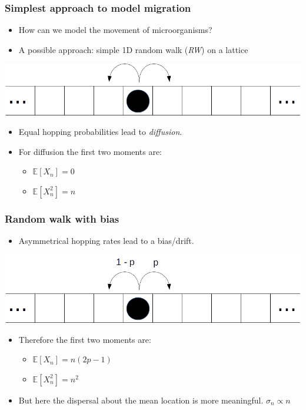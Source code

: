 \documentclass[11pt]{beamer}
\begin{document}
\begin{frame}
 \frametitle{Simplest approach to model migration}
 
 \begin{itemize}
  \item How can we model the movement of microorganisms?
  \item A possible approach: simple 1D random walk (\textit{RW}) on a lattice
 \end{itemize}
 \begin{center}
  \includegraphics[width=0.9\linewidth]{gfx/1D-SRW.png}
 \end{center} 
 \begin{itemize}
  \item Equal hopping probabilities lead to \textit{diffusion}.
  \item For diffusion the first two moments are:
  \begin{itemize}
   \item $\mathbb{E}\left[X_n\right] = 0$\newline
   \item $\mathbb{E}\left[X^2_n\right] = n$
  \end{itemize}
 \end{itemize}
 
\end{frame}


\begin{frame}
 \frametitle{Random walk with bias}
 
 \begin{itemize}
  \item Asymmetrical hopping rates lead to a bias/drift.
  \end{itemize}
  \begin{center}
   \includegraphics[width=0.9\linewidth]{gfx/1D-BRW.png}
  \end{center}
  \begin{itemize}
    \item Therefore the first two moments are:
    \begin{itemize}
   \item $\mathbb{E}\left[X_n\right] = n\left(2p-1\right)$\newline
   \item $\mathbb{E}\left[X^2_n\right] = n^2$
  \end{itemize}
  \item But here the dispersal about the mean location is more meaningful.
        $\sigma_n \propto n$
  \end{itemize}

\end{frame}
\end{document}
